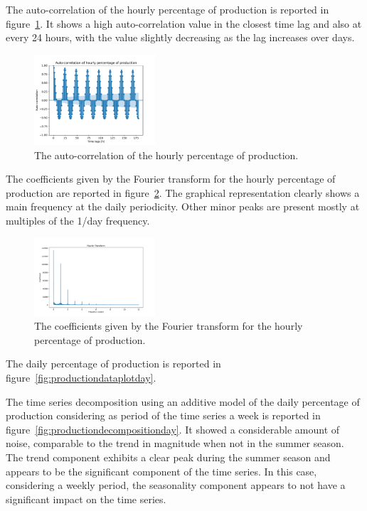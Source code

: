 The auto-correlation of the hourly percentage of production is reported in figure~\ref{fig:productioncorrelation}.
It shows a high auto-correlation value in the closest time lag and also at every 24 hours, with the value slightly decreasing as the lag increases over days.

\begin{figure}[H]
\centering
\includegraphics[width=0.4\textwidth]{images/production/hourly_correlation_week_range}
\caption{The auto-correlation of the hourly percentage of production.}
\label{fig:productioncorrelation}
\end{figure}

The coefficients given by the Fourier transform for the hourly percentage of production are reported in figure~\ref{fig:productionft}.
The graphical representation clearly shows a main frequency at the daily periodicity.
Other minor peaks are present mostly at multiples of the 1/day frequency.

\begin{figure}[H]
\centering
\includegraphics[width=0.4\textwidth]{images/production/ft_hour_day}
\caption{The coefficients given by the Fourier transform for the hourly percentage of production.}
\label{fig:productionft}
\end{figure}

The daily percentage of production is reported in figure~\ref{fig:productiondataplotday}.

The time series decomposition using an additive model of the daily percentage of production considering as period of the time series a week is reported in figure~\ref{fig:productiondecompositionday}.
It showed a considerable amount of noise, comparable to the trend in magnitude when not in the summer season.
The trend component exhibits a clear peak during the summer season and appears to be the significant component of the time series.
In this case, considering a weekly period, the seasonality component appears to not have a significant impact on the time series.

